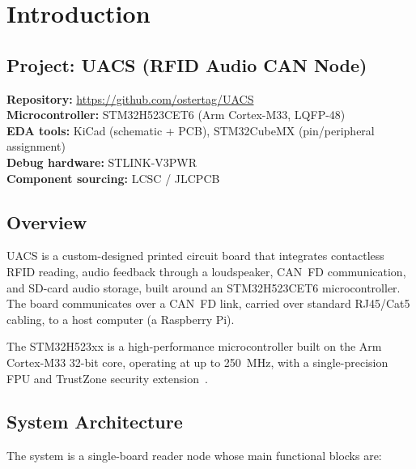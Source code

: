\chapter*{Introduction}

\section*{Project: UACS (RFID Audio CAN Node)}

\noindent
\textbf{Repository:} \url{https://github.com/ostertag/UACS}\\
\textbf{Microcontroller:} STM32H523CET6 (Arm Cortex-M33, LQFP-48)\\
\textbf{EDA tools:} KiCad (schematic + PCB), STM32CubeMX (pin/peripheral assignment)\\
\textbf{Debug hardware:} STLINK-V3PWR\\
\textbf{Component sourcing:} LCSC / JLCPCB

\section*{Overview}

UACS is a custom-designed printed circuit board that integrates contactless RFID reading,
audio feedback through a loudspeaker, CAN~FD communication, and SD-card audio storage,
built around an STM32H523CET6 microcontroller. The board communicates over a CAN~FD link,
carried over standard RJ45/Cat5 cabling, to a host computer (a Raspberry Pi).

The STM32H523xx is a high-performance microcontroller built on the Arm Cortex-M33 32-bit
core, operating at up to \SI{250}{\mega\hertz}, with a single-precision FPU and TrustZone
security extension~\cite{ref1}.

\section*{System Architecture}

The system is a single-board reader node whose main functional blocks are:

